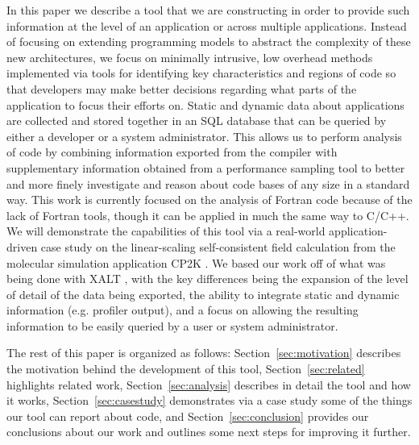 In this paper we describe a tool that we are constructing in order to provide such information at the level of an application or across multiple applications.
Instead of focusing on extending programming models to abstract the complexity of these new architectures, we focus on minimally intrusive, low overhead methods implemented via tools for identifying key characteristics and regions of code so that developers may make better decisions regarding what parts of the application to focus their efforts on.
Static and dynamic data about applications are collected and stored together in an \acs{SQL} database that can be queried by either a developer or a system administrator.
This allows us to perform analysis of code by combining information exported from the compiler with supplementary information obtained from a performance sampling tool to better and more finely investigate and reason about code bases of any size in a standard way.
This work is currently focused on the analysis of Fortran code because of the lack of Fortran tools, though it can be applied in much the same way to C/C++.
We will demonstrate the capabilities of this tool via a real-world application-driven case study on the linear-scaling self-consistent field calculation \cite{vandevondele2012linear} from the molecular simulation application CP2K \cite{hutter2014cp2k}.
We based our work off of what was being done with XALT \cite{7081224}, with the key differences being the expansion of the level of detail of the data being exported, the ability to integrate static and dynamic information (e.g. profiler output), and a focus on allowing the resulting information to be easily queried by a user or system administrator.

The rest of this paper is organized as follows: Section~\ref{sec:motivation} describes the motivation behind the development of this tool, Section~\ref{sec:related} highlights related work, Section~\ref{sec:analysis} describes in detail the tool and how it works, Section~\ref{sec:casestudy} demonstrates via a case study some of the things our tool can report about code, and Section~\ref{sec:conclusion} provides our conclusions about our work and outlines some next steps for improving it further.
